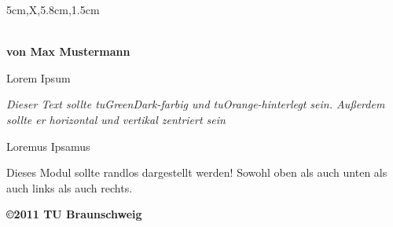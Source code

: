 \documentclass[a3paper,style=scifi,table,scifiposter]{tubsposter}
\begin{document}
  \begin{modulepage}[sender=bottom,bgcolor=tuVioletLight]{5cm,X,5.8cm,1.5cm}
  \showtubslogo[right]
  \begin{modrow}[bgcolor=tuGreenLight80]
    \bfseries{}\\[1em]
    von Max Mustermann
  \end{modrow}
  \begin{modrow}[X,X]
    \begin{modcol}
      {Lorem Ipsum}\\[2ex]
      \lipsum[1-2]
    \end{modcol}
    \begin{modcol}[X,X]
      \begin{modsubrow}[bgimage=infozentrum,imagefit=autoclip]
      \end{modsubrow}
      \begin{modsubrow}[c,bgcolor=tuOrange,fgcolor=tuGreenDark]
        \centering\itshape
        Dieser Text sollte tuGreenDark-farbig und tuOrange-hinterlegt sein.
        Außerdem sollte er horizontal und vertikal zentriert sein\par
        \raggedleft\upshape
        Loremus Ipsamus
      \end{modsubrow}
    \end{modcol}
  \end{modrow}
  \begin{modrow*}
    \large
    Dieses Modul sollte randlos dargestellt werden!
    Sowohl oben als auch unten als auch links als auch rechts.
  \end{modrow*}
  \begin{modrow}[bgcolor=tuGreen]
    \bfseries\raggedleft\textcolor{tuWhite}{\copyright 2011 TU Braunschweig}
  \end{modrow}
\end{modulepage}
\end{document}
